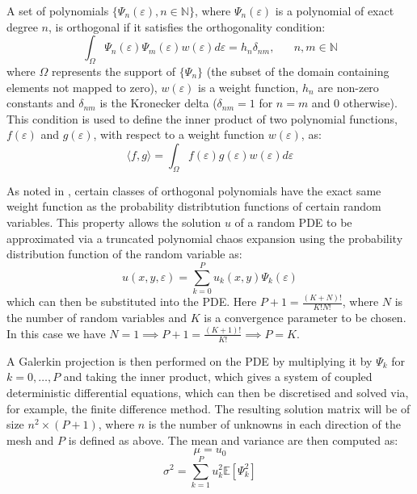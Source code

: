 \documentclass[11pt]{article}
\numberwithin{equation}{section}
\begin{document}
A set of polynomials $\{\Psi_n(\varepsilon), n \in \mathbb{N}\}$, where $\Psi_n(\varepsilon)$ is a polynomial of exact degree $n$, is orthogonal if it satisfies the orthogonality condition:
\begin{equation}
\int_{\Omega} \Psi_n(\varepsilon) \Psi_m(\varepsilon) w(\varepsilon) d\varepsilon = h_n \delta_{nm}, \;\;\;\;\;\; n,m \in \mathbb{N}
\end{equation} 
where $\Omega$ represents the support of $\{\Psi_n\}$ (the subset of the domain containing elements not mapped to zero), $w(\varepsilon)$ is a weight function, $h_n$ are non-zero constants and $\delta_{nm}$ is the Kronecker delta ($\delta_{nm} = 1$ for $n=m$ and $0$ otherwise). This condition is used to define the inner product of two polynomial functions, $f(\varepsilon)$ and $g(\varepsilon)$, with respect to a weight function $w(\varepsilon)$, as:
\begin{equation}
\langle f, g \rangle = \int_{\Omega} f(\varepsilon)g(\varepsilon)w(\varepsilon) d\varepsilon
\end{equation}

As noted in \cite{Xiu}, certain classes of orthogonal polynomials have the exact same weight function as the probability distribtution functions of certain random variables. This property allows the solution $u$ of a random PDE to be approximated via a truncated polynomial chaos expansion using the probability distribution function of the random variable as:
\begin{equation}
u(x,y,\varepsilon) = \sum_{k=0}^P u_k(x,y) \Psi_k(\varepsilon)
\end{equation}
which can then be substituted into the PDE. Here $P+1 = \frac{(K+N)!}{K!N!}$, where $N$ is the number of random variables and $K$ is a convergence parameter to be chosen. In this case we have $N=1 \implies P+1=\frac{(K+1)!}{K!}\implies P=K$.



A Galerkin projection is then performed on the PDE by multiplying it by $\Psi_k$ for $k=0, \dots, P$ and taking the inner product, which gives a system of coupled deterministic differential equations, which can then be discretised and solved via, for example, the finite difference method. The resulting solution matrix will be of size $n^2 \times (P+1)$, where $n$ is the number of unknowns in each direction of the mesh and $P$ is defined as above. The mean and variance are then computed as:
\begin{equation}
\mu = u_0
\end{equation}
\begin{equation}
\sigma^2 = \sum_{k=1}^P u_k^2 \mathbb{E}[\Psi_k^2]
\end{equation}
\end{document}

